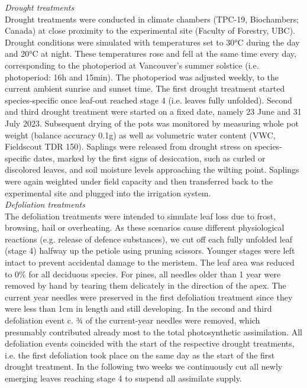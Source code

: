 \documentclass{article}
\begin{document}
	\textit{Drought treatments} \\
	Drought treatments were conducted in climate chambers (TPC-19, Biochambers; Canada) at close proximity to the experimental site (Faculty of Forestry, UBC). Drought conditions were simulated with temperatures set to 30°C during the day and 20°C at night. These temperatures rose and fell at the same time every day, corresponding to the photoperiod at Vancouver’s summer solstice (i.e. photoperiod: 16h and 15min). The photoperiod was adjusted weekly, to the current ambient sunrise and sunset time. 
	The first drought treatment started species-specific once leaf-out reached stage 4 (i.e. leaves fully unfolded). Second and third drought treatment were started on a fixed date, namely 23 June and 31 July 2023. Subsequent drying of the pots was monitored by measuring whole pot weight (balance accuracy 0.1g) as well as volumetric water content (VWC, Fieldscout TDR 150). Saplings were released from drought stress on species-specific dates, marked by the first signs of desiccation, such as curled or discolored leaves, and soil moisture levels approaching the wilting point. %
	Saplings were again weighted under field capacity and then transferred back to the experimental site and plugged into the irrigation system. \\
	
	\textit{Defoliation treatments} \\
	The defoliation treatments were intended to simulate leaf loss due to frost, browsing, hail or overheating. As these scenarios cause different physiological reactions (e.g. release of defence substances), we cut off each fully unfolded leaf (stage 4) halfway up the petiole using pruning scissors. Younger stages were left intact to prevent accidental damage to the meristem. The leaf area was reduced to 0\% for all deciduous species. For pines, all needles older than 1 year were removed by hand by tearing them delicately in the direction of the apex. The current year needles were preserved in the first defoliation treatment since they were less than 1cm in length and still developing. In the second and third defoliation event c. ¾ of the current-year needles were removed, which presumably contributed already most to the total photosynthetic assimilation. All defoliation events coincided with the start of the respective drought treatments, i.e. the first defoliation took place on the same day as the start of the first drought treatment. In the following two weeks we continuously cut all newly emerging leaves reaching stage 4 to suspend all assimilate supply. %
	
\end{document}
